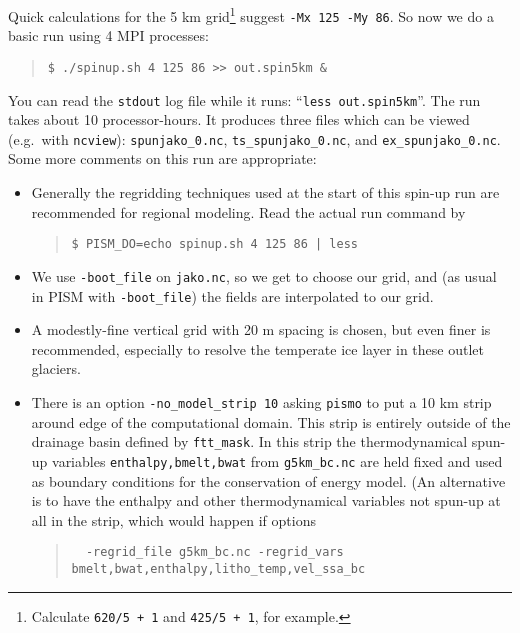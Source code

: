 Quick calculations for the 5 km grid\footnote{Calculate \texttt{620/5 + 1} and \texttt{425/5 + 1}, for example.} suggest \verb|-Mx 125 -My 86|.  So now we do a basic run using 4 MPI processes:
\begin{quote}\small
\begin{verbatim}
$ ./spinup.sh 4 125 86 >> out.spin5km &
\end{verbatim}
\normalsize\end{quote}
You can read the \texttt{stdout} log file while it runs: ``\verb|less out.spin5km|''.  The run takes about 10 processor-hours.   %
It produces three files which can be viewed (e.g.~with \verb|ncview|): \verb|spunjako_0.nc|, \verb|ts_spunjako_0.nc|, and \verb|ex_spunjako_0.nc|.  Some more comments on this run are appropriate:
\begin{itemize}
\item Generally the regridding techniques used at the start of this spin-up run are recommended for regional modeling.  Read the actual run command by
\begin{quote}\small
\begin{verbatim}
$ PISM_DO=echo spinup.sh 4 125 86 | less
\end{verbatim}
\normalsize\end{quote}
\item  We use \verb|-boot_file| on \verb|jako.nc|, so we get to choose our grid, and (as usual in PISM with \verb|-boot_file|) the fields are interpolated to our grid.
\item A modestly-fine vertical grid with 20 m spacing is chosen, but even finer is recommended, especially to resolve the temperate ice layer in these outlet glaciers.
\item There is an option \verb|-no_model_strip 10| asking \verb|pismo| to put a 10 km strip around edge of the computational domain.  This strip is entirely outside of the drainage basin defined by \verb|ftt_mask|.  In this strip the thermodynamical spun-up variables \verb|enthalpy,bmelt,bwat| from \verb|g5km_bc.nc| are held fixed and used as boundary conditions for the conservation of energy model. (An alternative is to have the enthalpy and other thermodynamical variables not spun-up at all in the strip, which would happen if options 
\begin{quote}\small
\begin{verbatim}
  -regrid_file g5km_bc.nc -regrid_vars bmelt,bwat,enthalpy,litho_temp,vel_ssa_bc
\end{verbatim}

\end{quote}
\end{itemize}
